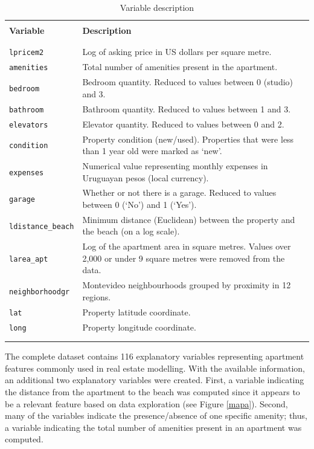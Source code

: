 \documentclass[smallextended,natbib]{svjour3}\usepackage[]{graphicx}\usepackage[]{xcolor}
\begin{document}
\begin{table}[hbpt]
	\centering
	\caption{Variable description\label{tabvar} }
\scriptsize
\begin{tabular}{p{2.4cm}p{7cm}}
		\hline \\[-1.8ex] 
\textbf{Variable} &  	\textbf{Description} \\
		\hline \\[-1.8ex] 	\hline \\[-1.8ex] 

\texttt{lpricem2}  & Log of asking price in US dollars per square metre. \\ \hline
  
\texttt{amenities}  & Total number of amenities present in the apartment.\\
\texttt{bedroom}  & Bedroom quantity. Reduced to values between 0 (studio) and 3. \\
\texttt{bathroom}  & Bathroom quantity. Reduced to values between 1 and 3.\\
\texttt{elevators}  & Elevator quantity. Reduced to values between 0 and 2. \\
\texttt{condition}  & Property condition (new/used).  Properties that were less than 1 year old were marked as `new'.\\
\texttt{expenses}  &  Numerical value representing monthly expenses in Uruguayan pesos (local currency).\\
\texttt{garage}  & Whether or not there is a garage. Reduced to values between 0 (`No') and 1 (`Yes').\\ 
\texttt{ldistance\_beach}  & Minimum distance (Euclidean)  between  the property   and the beach (on a log scale). \\
\texttt{larea\_apt}  & Log of the apartment area in square metres. Values over 2,000 or under 9 square metres were removed from the data. \\
\texttt{neighborhoodgr}  &  Montevideo neighbourhoods grouped by proximity in 12 regions. \\ \hline
\texttt{lat} & Property latitude coordinate. \\
\texttt{long}  & Property longitude coordinate. \\
	\hline \\[-1.8ex] 	\hline \\[-1.8ex]  
	\end{tabular}
\end{table}

The complete dataset contains 116 explanatory variables representing apartment features commonly used in real estate modelling. With the available information, an additional two explanatory variables were created. First, a variable indicating the distance from the apartment to the beach was computed since it appears to be a relevant feature based on data exploration (see Figure \ref{mapa}). Second, many of the variables indicate the presence/absence of one specific amenity; thus, a variable indicating the total number of amenities present in an apartment was computed. 
\end{document}
